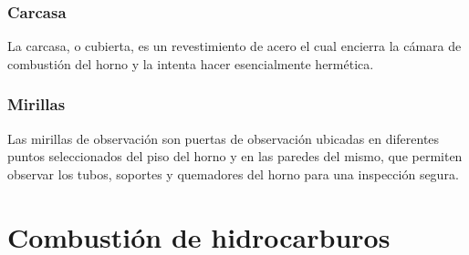 \subsubsection{Carcasa}
\par La carcasa, o cubierta, es un revestimiento de acero el cual encierra la cámara de combustión del horno y la intenta hacer esencialmente hermética.

\subsubsection{Mirillas}
\par Las mirillas de observación son puertas de observación ubicadas en diferentes puntos seleccionados del piso del horno y en las paredes del mismo, que permiten observar los tubos, soportes y quemadores del horno para una inspección segura.


\section{Combustión de hidrocarburos}
